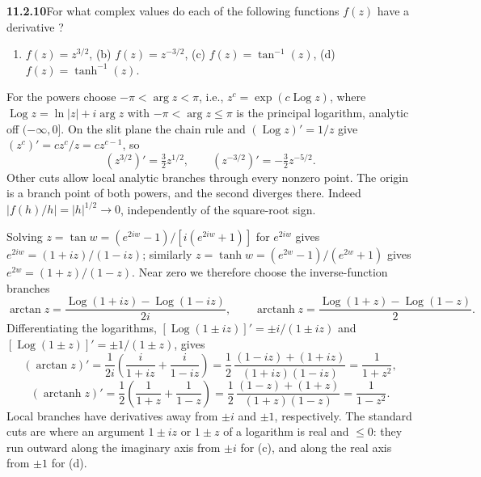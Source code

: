 \par\bigskip
\noindent\textbf{11.2.10}\quad For what complex values do each of the
following functions $f(z)$ have a derivative ?
\begin{enumerate}
\item[(a)] $f(z)=z^{3/2}$,\qquad
(b) $f(z)=z^{-3/2}$,\qquad
(c) $f(z)=\tan^{-1}(z)$,\qquad
(d) $f(z)=\tanh^{-1}(z)$.
\end{enumerate}
\solution
{}
For the powers choose $-\pi<\arg z<\pi$, i.e.,
$z^c=\exp(c\operatorname{Log}z)$, where
$\operatorname{Log}z=\ln|z|+i\arg z$ with $-\pi<\arg z\le\pi$ is the
principal logarithm, analytic off $(-\infty,0]$. On the slit plane the
chain rule and $(\operatorname{Log}z)'=1/z$ give $(z^c)'=cz^c/z=cz^{c-1}$, so
\[
(z^{3/2})'=\tfrac32z^{1/2},\qquad
(z^{-3/2})'=-\tfrac32z^{-5/2}.
\]
Other cuts allow local analytic branches through every nonzero
point. The origin is a branch point of both powers, and the second
diverges there.
Indeed $|f(h)/h|=|h|^{1/2}\to0$, independently of the square-root sign.

Solving $z=\tan w=(e^{2iw}-1)/[i(e^{2iw}+1)]$ for $e^{2iw}$ gives
$e^{2iw}=(1+iz)/(1-iz)$; similarly
$z=\tanh w=(e^{2w}-1)/(e^{2w}+1)$ gives $e^{2w}=(1+z)/(1-z)$.
Near zero we therefore choose the inverse-function branches
\[
\arctan z=\frac{\operatorname{Log}(1+iz)-\operatorname{Log}(1-iz)}{2i},\qquad
\operatorname{arctanh}z=\frac{\operatorname{Log}(1+z)-\operatorname{Log}(1-z)}2.
\]
Differentiating the logarithms,
$[\operatorname{Log}(1\pm iz)]'=\pm i/(1\pm iz)$ and
$[\operatorname{Log}(1\pm z)]'=\pm1/(1\pm z)$, gives
\[
(\arctan z)'=\frac1{2i}\left(\frac i{1+iz}+\frac i{1-iz}\right)
=\frac12\,\frac{(1-iz)+(1+iz)}{(1+iz)(1-iz)}
=\boxed{\frac1{1+z^2}},
\]
\[
(\operatorname{arctanh}z)'=\frac12
\left(\frac1{1+z}+\frac1{1-z}\right)
=\frac12\,\frac{(1-z)+(1+z)}{(1+z)(1-z)}
=\boxed{\frac1{1-z^2}}.
\]
Local branches have derivatives away from $\pm i$ and $\pm1$,
respectively. The standard cuts are where an argument $1\pm iz$ or
$1\pm z$ of a logarithm is real and $\le0$: they run outward along the
imaginary axis from $\pm i$ for (c), and along the real axis from
$\pm1$ for (d).

